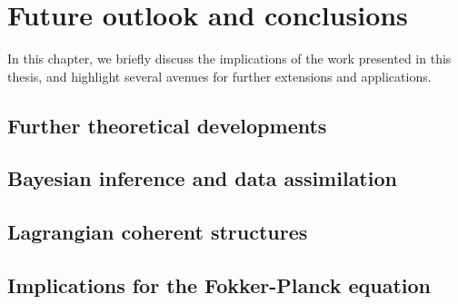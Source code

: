 \chapter{Future outlook and conclusions}
In this chapter, we briefly discuss the implications of the work presented in this thesis, and highlight several avenues for further extensions and applications.


\section{Further theoretical developments}


\section{Bayesian inference and data assimilation}


\section{Lagrangian coherent structures}


\section{Implications for the Fokker-Planck equation}


